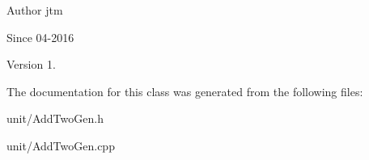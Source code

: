 \begin{DoxyAuthor}{Author}
jtm 
\end{DoxyAuthor}
\begin{DoxySince}{Since}
04-\/2016 
\end{DoxySince}
\begin{DoxyVersion}{Version}
1. 
\end{DoxyVersion}


The documentation for this class was generated from the following files\+:\begin{DoxyCompactItemize}
\item 
unit/Add\+Two\+Gen.\+h\item 
unit/Add\+Two\+Gen.\+cpp\end{DoxyCompactItemize}
